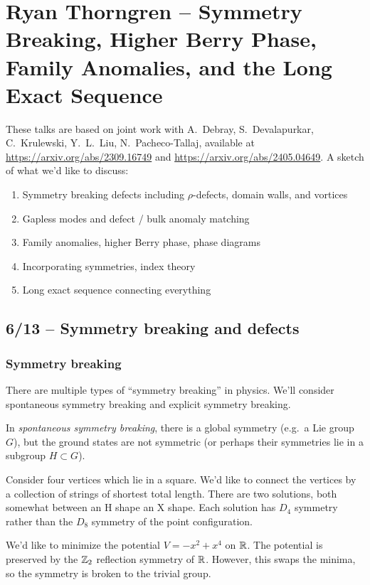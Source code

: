 \chapter{Ryan Thorngren -- Symmetry Breaking, Higher Berry Phase, Family Anomalies, and the Long Exact Sequence}

These talks are based on joint work with A.\ Debray, S.\ Devalapurkar, C.\ Krulewski, Y.\ L.\ Liu, N.\ Pacheco-Tallaj, available at \url{https://arxiv.org/abs/2309.16749} and \url{https://arxiv.org/abs/2405.04649}.
A sketch of what we'd like to discuss: 
\begin{enumerate}
	\item Symmetry breaking defects including $\rho$-defects, domain walls, and vortices
	\item Gapless modes and defect / bulk anomaly matching
	\item Family anomalies, higher Berry phase, phase diagrams
	\item Incorporating symmetries, index theory
	\item Long exact sequence connecting everything
\end{enumerate}

\section{6/13 -- Symmetry breaking and defects}

\subsection{Symmetry breaking}

There are multiple types of ``symmetry breaking'' in physics.
We'll consider spontaneous symmetry breaking and explicit symmetry breaking.

In \emph{spontaneous symmetry breaking}, there is a global symmetry (e.g.\ a Lie group $G$), but the ground states are not symmetric (or perhaps their symmetries lie in a subgroup $H \subset G$).

\begin{ex}
	Consider four vertices which lie in a square.
	We'd like to connect the vertices by a collection of strings of shortest total length.
	There are two solutions, both somewhat between an H shape an X shape.
	Each solution has $D_4$ symmetry rather than the $D_8$ symmetry of the point configuration.
\end{ex}

\begin{ex}
	We'd like to minimize the potential $V = -x^2 + x^4$ on $\mathbb{R}$.
	The potential is preserved by the $\mathbb{Z}_2$ reflection symmetry of $\mathbb{R}$.
	However, this swaps the minima, so the symmetry is broken to the trivial group.
\end{ex}


